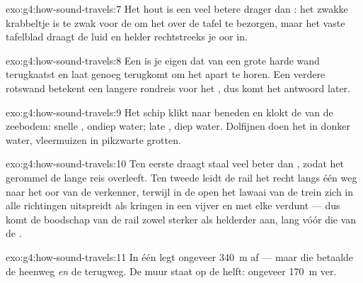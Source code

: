 \begin{solution}{exo:g4:how-sound-travels:7}
Het hout is een veel betere drager dan : het zwakke krabbeltje
is te zwak voor de  om het over de tafel te bezorgen, maar het
vaste tafelblad draagt de  luid en helder rechtstreeks je
oor in.
\end{solution}

\begin{solution}{exo:g4:how-sound-travels:8}
Een  is je eigen  dat van een grote harde wand terugkaatst
en laat genoeg terugkomt om het apart te horen. Een verdere rotswand
betekent een langere rondreis voor het , dus komt het antwoord
later.
\end{solution}

\begin{solution}{exo:g4:how-sound-travels:9}
Het schip klikt naar beneden en klokt de  van de zeebodem:
snelle , ondiep water; late , diep water. Dolfijnen doen het
in donker water, vleermuizen in pikzwarte grotten.
\end{solution}

\begin{solution}{exo:g4:how-sound-travels:10}
Ten eerste draagt staal  veel beter dan , zodat het
gerommel de lange reis overleeft. Ten tweede leidt de rail het
 recht langs één weg naar het oor van de verkenner, terwijl in
de open  het lawaai van de trein zich in alle richtingen
uitspreidt als kringen in een vijver en met elke  verdunt --- dus
komt de boodschap van de rail zowel sterker als helderder aan, lang
vóór die van de .
\end{solution}

\begin{solution}{exo:g4:how-sound-travels:11}
In één  legt  ongeveer \qty{340}{m} af --- maar die
 betaalde de heenweg \emph{en} de terugweg. De muur staat op de
helft: ongeveer \qty{170}{m} ver.
\end{solution}
